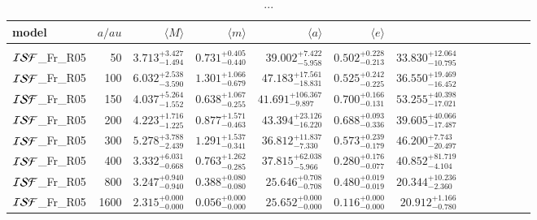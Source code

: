 \documentclass[aa]{lib/aa}
\begin{document}
\begin{table}
 \caption{...}
 \label{Tab:model_PP}
 \centering 
 \begin{tabular}{lrrrrrrrrrrrr}
   \hline\hline
model &$a/au$ & $\langle M \rangle$ & $\langle m \rangle$ & $\langle a \rangle$ & $\langle e \rangle$ \\
        \hline \vspace{-0.75em}\\
${\cal ISF}$\_Fr\_R05 & 50 &$3.713^{+3.427}_{-1.494}$ & $0.731^{+0.405}_{-0.440}$ & $39.002^{+7.422}_{-5.958}$ & $0.502^{+0.228}_{-0.213}$& $33.830^{+12.064}_{-10.795}$  \\
${\cal ISF}$\_Fr\_R05 &100 &$6.032^{+2.538}_{-3.590}$ & $1.301^{+1.066}_{-0.679}$ & $47.183^{+17.561}_{-18.831}$ & $0.525^{+0.242}_{-0.225}$& $36.550^{+19.469}_{-16.452}$  \\
${\cal ISF}$\_Fr\_R05 &150 & $4.037^{+5.264}_{-1.552}$ & $0.638^{+1.067}_{-0.255}$ & $41.691^{+106.367}_{-9.897}$ & $0.700^{+0.166}_{-0.131}$& $53.255^{+40.398}_{-17.021}$  \\
${\cal ISF}$\_Fr\_R05 &200 &$4.223^{+1.716}_{-1.225}$ & $0.877^{+1.571}_{-0.463}$ & $43.394^{+23.126}_{-16.220}$ & $0.688^{+0.093}_{-0.336}$& $39.605^{+40.066}_{-17.487}$  \\
${\cal ISF}$\_Fr\_R05 &300 &$5.278^{+3.788}_{-2.439}$ & $1.291^{+1.537}_{-0.341}$ & $36.812^{+11.837}_{-7.330}$ & $0.573^{+0.239}_{-0.179}$& $46.200^{+7.743}_{-20.497}$  \\
${\cal ISF}$\_Fr\_R05 &400 &$3.332^{+6.031}_{-0.668}$ & $0.763^{+1.262}_{-0.285}$ & $37.815^{+62.038}_{-5.966}$ & $0.280^{+0.176}_{-0.077}$& $40.852^{+81.719}_{-4.104}$  \\
${\cal ISF}$\_Fr\_R05 &800 &$3.247^{+0.940}_{-0.940}$ & $0.388^{+0.080}_{-0.080}$ & $25.646^{+0.708}_{-0.708}$ & $0.480^{+0.019}_{-0.019}$& $20.344^{+10.236}_{-2.360}$  \\
${\cal ISF}$\_Fr\_R05 &1600 &$2.315^{+0.000}_{-0.000}$ & $0.056^{+0.000}_{-0.000}$ & $25.652^{+0.000}_{-0.000}$ & $0.116^{+0.000}_{-0.000}$& $20.912^{+1.166}_{-0.780}$  \\
\end{tabular}
\end{table}
\end{document}
